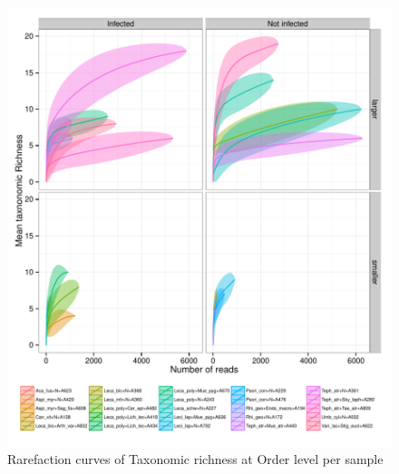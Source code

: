 \documentclass[a4paper, 11]{article}\usepackage[]{graphicx}\usepackage[]{color}
\makeatletter
\def\maxwidth{ %
  \ifdim\Gin@nat@width>\linewidth
    \linewidth
  \else
    \Gin@nat@width
  \fi
}
\newenvironment{knitrout}{}{} %
\makeatother
\begin{document}
\begin{knitrout}
\color{fgcolor}\begin{figure}[H]
\includegraphics[width=\maxwidth]{figure/rarefact_Orders-1} \caption[Rarefaction curves of Taxonomic richness at Order level per sample]{Rarefaction curves of Taxonomic richness at Order level per sample}\label{fig:rarefact_Orders}
\end{figure}


\end{knitrout}
\end{document}
